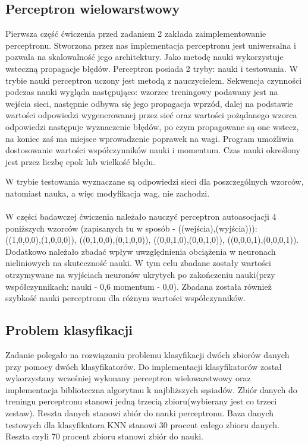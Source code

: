 \documentclass{classrep}
\begin{document}
	{
		\subsection{Perceptron wielowarstwowy}
		Pierwsza część ćwiczenia przed zadaniem 2 zakłada zaimplementowanie perceptronu.
		Stworzona przez nas implementacja perceptronu jest uniwersalna i pozwala na skalowalność jego architektury. Jako metodę nauki wykorzystuje wsteczną propagacje błędów.
		Perceptron posiada 2 tryby: nauki i testowania. W trybie nauki perceptron uczony jest metodą z nauczycielem. Sekwencja czynności podczas nauki wygląda następująco: wzorzec 				treningowy podawany jest na wejścia sieci, następnie odbywa się jego propagacja wprzód, dalej na podstawie wartości odpowiedzi wygenerowanej przez sieć oraz wartości 					pożądanego wzorca odpowiedzi następuje wyznaczenie błędów, po czym propagowane są one wstecz, na koniec zaś ma miejsce wprowadzenie poprawek na wagi. Program 					umożliwia dostosowanie wartości współczynników nauki i momentum. Czas nauki określony jest przez liczbę epok lub wielkość błędu.
				
		W trybie testowania wyznaczane są odpowiedzi sieci dla poszczególnych wzorców, natomiast nauka, a więc modyfikacja wag, nie zachodzi.\\\\
		W części badawczej ćwiczenia należało 
		nauczyć perceptron autoasocjacji 4 poniższych wzorców (zapisanych tu w sposób - ((wejścia),(wyjścia))):\\
		((1,0,0,0),(1,0,0,0)), ((0,1,0,0),(0,1,0,0)), ((0,0,1,0),(0,0,1,0)), ((0,0,0,1),(0,0,0,1)).
		Dodatkowo należało zbadać wpływ uwzględnienia obciążenia w neuronach nieliniowych na skuteczność nauki. W tym celu zbadane zostały wartości otrzymywane na wyjściach 				neuronów ukrytych po zakończeniu nauki(przy współczynnikach: nauki - 0,6 momentum - 0,0).
		Zbadana została również szybkość nauki perceptronu dla różnym wartości współczynników.
		\subsection{Problem klasyfikacji}
		Zadanie polegało na rozwiązaniu problemu klasyfikacji dwóch zbiorów danych przy pomocy dwóch klasyfikatorów.
		Do implementacji klasyfikatorów został wykorzystany wcześniej wykonany perceptron wielowarstwowy oraz implementacja biblioteczna algorytmu k najbliższych sąsiadów.
		Zbiór danych do treningu perceptronu stanowi jedną trzecią zbioru(wybierany jest co trzeci zestaw). Reszta danych stanowi zbiór do nauki perceptronu. Baza danych testowych dla 		klasyfikatora KNN stanowi 30 procent całego zbioru danych. Reszta czyli 70 procent zbioru stanowi zbiór do nauki.
		
	}
	
\end{document}
